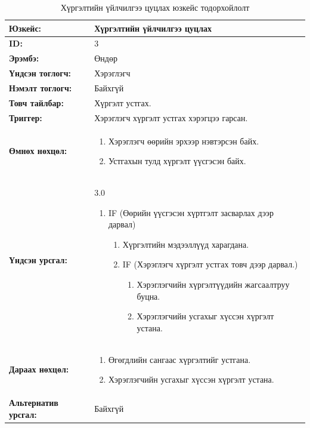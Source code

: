 \begin{table}[H]
    \caption{Хүргэлтийн үйлчилгээ цуцлах юзкейс тодорхойлолт}
    \begin{tabular}{|l|p{9cm}|}
		\hline
		{\bfseries Юзкейс:} & Хүргэлтийн үйлчилгээ цуцлах \\\hline
		{\bfseries ID:} & 3 \\\hline
		{\bfseries Эрэмбэ:} & Өндөр \\\hline
		{\bfseries Үндсэн тоглогч:} & Хэрэглэгч \\\hline
		{\bfseries Нэмэлт тоглогч:} & Байхгүй \\\hline
		{\bfseries Товч тайлбар:} & Хүргэлт устгах.\\\hline
		{\bfseries Триггер:} & Хэрэглэгч хүргэлт устгах хэрэгцээ гарсан. \\\hline
		{\bfseries Өмнөх нөхцөл:} &
		    \begin{enumerate}[nosep]
		        \item Хэрэглэгч өөрийн эрхээр нэвтэрсэн байх.
		        \item Устгахын тулд хүргэлт үүсгэсэн байх.
		    \end{enumerate}
		\\\hline
		{\bfseries Үндсэн урсгал:} &
			3.0
			\begin{enumerate}[nosep]
				\item IF (Өөрийн үүсгэсэн хүртгэлт засварлах дээр дарвал)
				    \begin{enumerate}[nosep]
				        \item Хүргэлтийн мэдээллүүд харагдана.
				        \item IF (Хэрэглэгч хүргэлт устгах товч дээр дарвал.)
                        \begin{enumerate}[nosep]
                            \item Хэрэглэгчийн хүргэлтүүдийн жагсаалтруу буцна.
                            \item Хэрэглэгчийн усгахыг хүссэн хүргэлт устана.
                        \end{enumerate}
				    \end{enumerate}
			\end{enumerate}
		\\\hline
		{\bfseries Дараах нөхцөл:} &
		    \begin{enumerate}[nosep]
		        \item Өгөгдлийн сангаас хүргэлтийг устгана.
		        \item Хэрэглэгчийн усгахыг хүссэн хүргэлт устана.
		    \end{enumerate}
		\\\hline
		{\bfseries Альтернатив урсгал:} & Байхгүй
		\\\hline
    \end{tabular}
\end{table}

